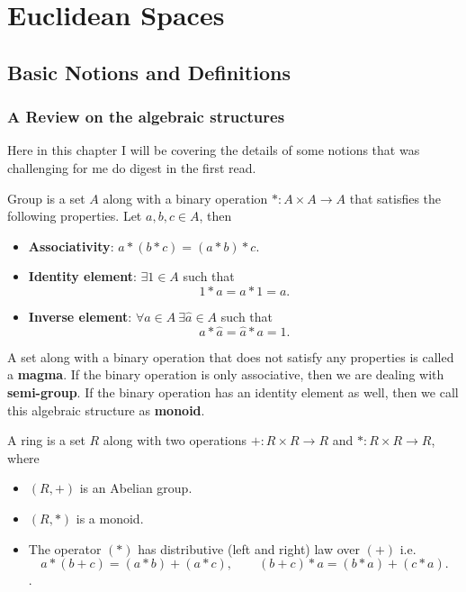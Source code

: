 \chapter{Euclidean Spaces}

\section{Basic Notions and Definitions}

\subsection{A Review on the algebraic structures}

Here in this chapter I will be covering the details of some notions that was challenging for me do digest in the first read.


\begin{definition}
	Group is a set $ A $ along with a binary operation $ *: A\times A \to A $ that satisfies the following properties. Let $ a,b,c \in A $, then
	\begin{itemize}
		\item \textbf{Associativity}: $ a*(b*c) = (a*b)*c $.
		\item \textbf{Identity element}: $ \exists 1 \in A $ such that 
		\[ 1*a = a*1 = a. \]
		\item \textbf{Inverse element}: $ \forall a \in A\ \exists\hat{a}\in A $ such that 
		\[ a*\hat{a} = \hat{a}*a = 1. \]
	\end{itemize}
\end{definition}
\begin{remark}
	A set along with a binary operation that does not satisfy any properties is called a \textbf{magma}. If the binary operation is only associative, then we are dealing with \textbf{semi-group}. If the binary operation has an identity element as well, then we call this algebraic structure as \textbf{monoid}.
\end{remark}

\begin{definition}
	A ring is a set $ R $ along with two operations $ +: R\times R \to R $ and $ *: R\times R \to R $, where
	\begin{itemize}
		\item $ (R,+) $ is an Abelian group.
		\item $ (R,*) $ is a monoid.
		\item The operator $ (*) $ has distributive (left and right) law over $ (+) $ i.e.
  			\[a*(b+c) = (a*b)+(a*c), \qquad (b+c)*a = (b*a) + (c*a).\].
	\end{itemize}
\end{definition}

